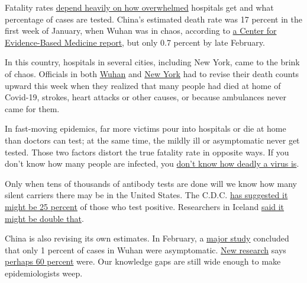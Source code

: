 Fatality rates
\href{https://www.nytimes3xbfgragh.onion/2020/04/10/nyregion/new-york-coronavirus-death-count.html}{depend
heavily on how overwhelmed} hospitals get and what percentage of cases
are tested. China's estimated death rate was 17 percent in the first
week of January, when Wuhan was in chaos, according to
\href{https://www.cebm.net/covid-19/global-covid-19-case-fatality-rates/}{a
Center for Evidence-Based Medicine report}, but only 0.7 percent by late
February.

In this country, hospitals in several cities, including New York, came
to the brink of chaos. Officials in both
\href{https://www.nytimes3xbfgragh.onion/2020/04/17/world/coronavirus-news.html\#link-f029419}{Wuhan}
and
\href{https://www.nytimes3xbfgragh.onion/2020/04/14/nyregion/new-york-coronavirus-deaths.html}{New
York} had to revise their death counts upward this week when they
realized that many people had died at home of Covid-19, strokes, heart
attacks or other causes, or because ambulances never came for them.

In fast-moving epidemics, far more victims pour into hospitals or die at
home than doctors can test; at the same time, the mildly ill or
asymptomatic never get tested. Those two factors distort the true
fatality rate in opposite ways. If you don't know how many people are
infected, you
\href{https://www.nytimes3xbfgragh.onion/2020/04/17/us/coronavirus-death-rate.html}{don't
know how deadly a virus is}.

Only when tens of thousands of antibody tests are done will we know how
many silent carriers there may be in the United States. The C.D.C.
\href{https://www.nytimes3xbfgragh.onion/2020/03/31/health/coronavirus-asymptomatic-transmission.html}{has
suggested it might be 25 percent} of those who test positive.
Researchers in Iceland
\href{https://www.cnn.com/2020/04/01/europe/iceland-testing-coronavirus-intl/index.html}{said
it might be double that}.

China is also revising its own estimates. In February, a
\href{https://jamanetwork.com/journals/jama/fullarticle/2762130}{major
study} concluded that only 1 percent of cases in Wuhan were
asymptomatic.
\href{https://www.scmp.com/news/china/society/article/3080058/coronavirus-china-launches-study-asymptomatic-cases-and-shared}{New
research} says
\href{https://www.scmp.com/news/china/society/article/3079012/coronavirus-68-cent-cases-confirmed-china-past-eight-days-had-no}{perhaps
60 percent} were. Our knowledge gaps are still wide enough to make
epidemiologists weep.

